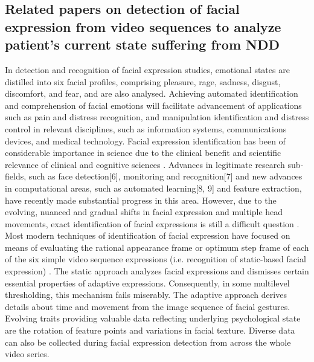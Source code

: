 \subsection{Related papers on detection of facial expression from video sequences to analyze patient's current state suffering from NDD}

 In detection and recognition of facial expression studies, emotional states are distilled into six facial profiles, comprising pleasure, rage, sadness, disgust, discomfort, and fear, and are also analysed. Achieving automated identification and comprehension of facial emotions will facilitate advancement of applications such as pain and distress recognition, and manipulation identification and distress control in relevant disciplines, such as information systems, communications devices, and medical technology. Facial expression identification has been of considerable importance in science due to the clinical benefit and scientific relevance of clinical and cognitive sciences \cite{pantic_face_2006}.
Advances in legitimate research sub-fields, such as face detection[6], monitoring and recognition[7] and new advances in computational areas, such as automated learning[8, 9] and feature extraction, have recently made substantial progress in this area. However, due to the evolving, nuanced and gradual shifts in facial expression and multiple head movements, exact identification of facial expressions is still a difficult question \cite{rein-lien_hsu_face_2002} \cite{fang_rank-n_2009}.
Most modern techniques of identification of facial expression have focused on means of evaluating the rational appearance frame or optimum step frame of each of the six simple video sequence expressions (i.e. recognition of static-based facial expression) \cite{cornelis_vaguely_2007}. The static approach analyzes facial expressions and dismisses certain essential properties of adaptive expressions. Consequently, in some multilevel thresholding, this mechanism fails miserably. The adaptive approach derives details about time and movement from the image sequence of facial gestures. Evolving traits providing valuable data reflecting underlying psychological state are the rotation of feature points and variations in facial texture. Diverse data can also be collected during facial expression detection from across the whole video series.

